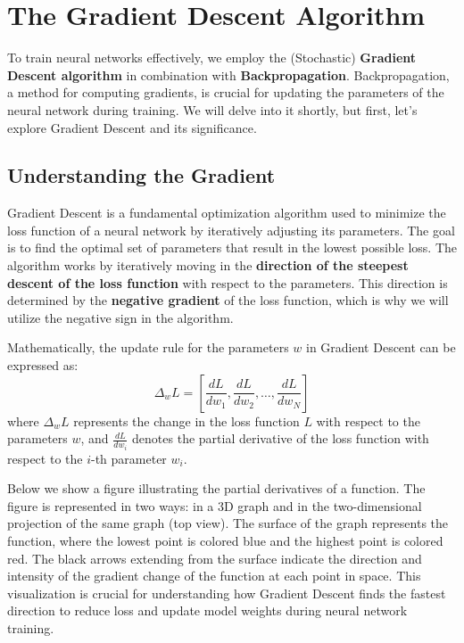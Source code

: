 \section{The Gradient Descent Algorithm}

\vspace{-0.4cm}
To train neural networks effectively, we employ the (Stochastic) \textbf{Gradient Descent algorithm} in combination with \textbf{Backpropagation}. Backpropagation, a method for computing gradients, is crucial for updating the parameters of the neural network during training. We will delve into it shortly, but first, let's explore Gradient Descent and its significance.
\vspace{-0.4cm}

\subsection{Understanding the Gradient}

Gradient Descent is a fundamental optimization algorithm used to minimize the loss function of a neural network by iteratively adjusting its parameters. The goal is to find the optimal set of parameters that result in the lowest possible loss. The algorithm works by iteratively moving in the \textbf{direction of the steepest descent of the loss function} with respect to the parameters. This direction is determined by the \textbf{negative gradient} of the loss function, which is why we will utilize the negative sign in the algorithm.

Mathematically, the update rule for the parameters \( w \) in Gradient Descent can be expressed as:
$$
\Delta_w L = \left[ \frac{dL}{dw_1}, \frac{dL}{dw_2}, \ldots , \frac{dL}{dw_N}\right]
$$
where \( \Delta_w L \) represents the change in the loss function \( L \) with respect to the parameters \( w \), and \( \frac{dL}{dw_i} \) denotes the partial derivative of the loss function with respect to the \( i \)-th parameter \( w_i \).

Below we show a figure illustrating the partial derivatives of a function. The figure is represented in two ways: in a 3D graph and in the two-dimensional projection of the same graph (top view). The surface of the graph represents the function, where the lowest point is colored blue and the highest point is colored red. The black arrows extending from the surface indicate the direction and intensity of the gradient change of the function at each point in space. This visualization is crucial for understanding how Gradient Descent finds the fastest direction to reduce loss and update model weights during neural network training.

